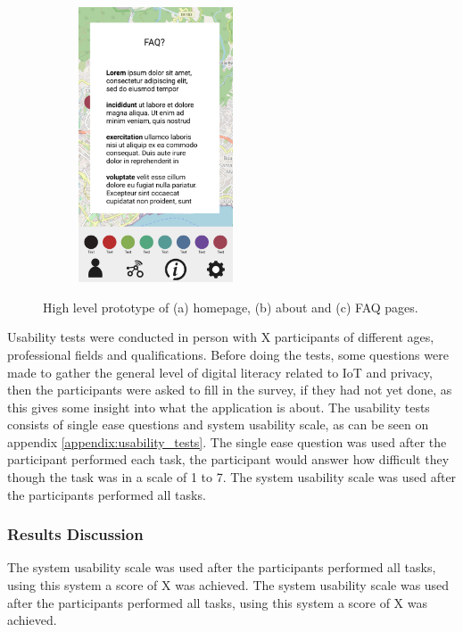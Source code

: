 \begin{figure}[H]
\begin{subfigure}{0.33\textwidth}
        \includegraphics[width=130pt]{../assets/images/low_more_info.png}
        \caption{}
        \label{fig:highfaq}
    \end{subfigure}%
    \caption{High level prototype of (a) homepage, (b) about and (c) FAQ pages.}
    \label{fig:highlevelprototype}
\end{figure}

Usability tests were conducted in person with X participants of different
ages, professional fields and qualifications. Before doing the tests,
some questions were made to gather the general level of digital literacy
related to IoT and privacy, then the participants were asked to fill in the
survey, if they had not yet done, as this gives some insight into what the
application is about. The usability tests consists of single ease questions
and system usability scale, as can be seen on appendix \ref{appendix:usability_tests}.
The single ease question was used after the participant performed each task, the
participant would answer how difficult they though the task was in a
scale of 1 to 7. The system usability scale was used after the participants
performed all tasks.

\subsubsection{Results Discussion}

The system usability scale was used after the participants
performed all tasks, using this system a score of X was achieved.
The system usability scale was used after the participants
performed all tasks, using this system a score of X was achieved.
